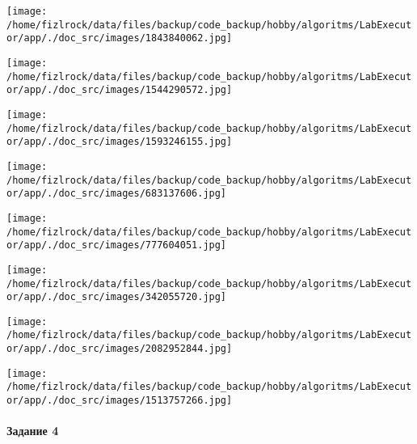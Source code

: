 \documentclass[a4paper, 12pt]{article}
\begin{document}
\texttt{[image: /home/fizlrock/data/files/backup/code\_backup/hobby/algoritms/LabExecutor/app/./doc\_src/images/1843840062.jpg]}

\texttt{[image: /home/fizlrock/data/files/backup/code\_backup/hobby/algoritms/LabExecutor/app/./doc\_src/images/1544290572.jpg]}

\texttt{[image: /home/fizlrock/data/files/backup/code\_backup/hobby/algoritms/LabExecutor/app/./doc\_src/images/1593246155.jpg]}

\texttt{[image: /home/fizlrock/data/files/backup/code\_backup/hobby/algoritms/LabExecutor/app/./doc\_src/images/683137606.jpg]}

\texttt{[image: /home/fizlrock/data/files/backup/code\_backup/hobby/algoritms/LabExecutor/app/./doc\_src/images/777604051.jpg]}

\texttt{[image: /home/fizlrock/data/files/backup/code\_backup/hobby/algoritms/LabExecutor/app/./doc\_src/images/342055720.jpg]}

\texttt{[image: /home/fizlrock/data/files/backup/code\_backup/hobby/algoritms/LabExecutor/app/./doc\_src/images/2082952844.jpg]}

\texttt{[image: /home/fizlrock/data/files/backup/code\_backup/hobby/algoritms/LabExecutor/app/./doc\_src/images/1513757266.jpg]}
\pagebreak
\paragraph{Задание 4}
\end{document}
